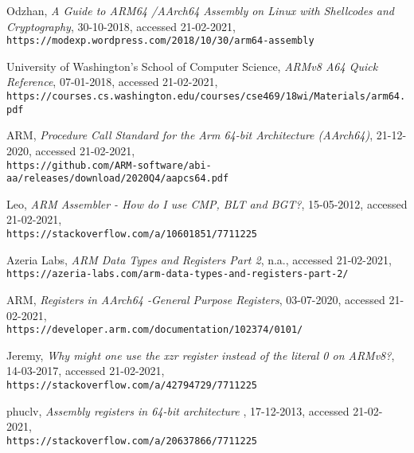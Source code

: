 \documentclass{article}
\begin{document}
\begin{thebibliography}{10}
Odzhan, \textit{A Guide to ARM64 \slash AArch64 Assembly on Linux with Shellcodes and Cryptography}, 30-10-2018, accessed 21-02-2021, \\\texttt{https://modexp.wordpress.com/2018/10/30/arm64-assembly}

University of Washington's School of Computer Science, \textit{ARMv8 A64 Quick Reference}, 07-01-2018, accessed 21-02-2021, \\\texttt{https://courses.cs.washington.edu/courses/cse469/18wi/Materials/arm64.pdf}

ARM, \textit{Procedure Call Standard for the Arm 64-bit
Architecture (AArch64)}, 21-12-2020, accessed 21-02-2021, \\\texttt{https://github.com/ARM-software/abi-aa/releases/download/2020Q4/aapcs64.pdf}

Leo, \textit{ARM Assembler - How do I use CMP, BLT and BGT?}, 15-05-2012, accessed 21-02-2021, \\\texttt{https://stackoverflow.com/a/10601851/7711225}

Azeria Labs, \textit{ARM Data Types and Registers Part 2}, n.a., accessed 21-02-2021, \\\texttt{https://azeria-labs.com/arm-data-types-and-registers-part-2/}

ARM, \textit{Registers in AArch64 -General Purpose Registers}, 03-07-2020, accessed 21-02-2021, \\\texttt{https://developer.arm.com/documentation/102374/0101/}

Jeremy, \textit{Why might one use the xzr register instead of the literal 0 on ARMv8?}, 14-03-2017, accessed 21-02-2021, \\\texttt{https://stackoverflow.com/a/42794729/7711225}

phuclv, \textit{Assembly registers in 64-bit architecture
}, 17-12-2013, accessed 21-02-2021, \\\texttt{https://stackoverflow.com/a/20637866/7711225}


\end{thebibliography}
\end{document}
